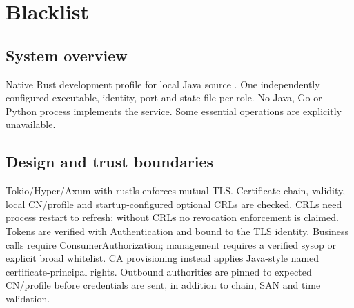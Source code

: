 \documentclass[a4paper]{arrowhead}
\begin{document}
\ArrowheadSetup
{}
\begin{center}\vspace*{6mm}{\LARGE Arrowhead support systems in Rust}\par\vspace{4mm}{\large Development implementation and interface catalogue}\end{center}
\begin{abstract}Fifteen active support-system profiles from the local modified Java tree have native Rust executables. This catalogue distinguishes implemented behavior, explicit unsupported interfaces and unqualified integrations. It is NOT a claim of complete v5.2.2 Java interchangeability.\end{abstract}
\clearpage\tableofcontents\clearpage
\section{Blacklist}
\subsection{System overview}
Native Rust development profile for local Java source . One independently configured executable, identity, port and state file per role. No Java, Go or Python process implements the service. Some essential operations are explicitly unavailable.
\subsection{Design and trust boundaries}
Tokio/Hyper/Axum with rustls enforces mutual TLS. Certificate chain, validity, local CN/profile and startup-configured optional CRLs are checked. CRLs need process restart to refresh; without CRLs no revocation enforcement is claimed. Tokens are verified with Authentication and bound to the TLS identity. Business calls require ConsumerAuthorization; management requires a verified sysop or explicit broad whitelist. CA provisioning instead applies Java-style named certificate-principal rights. Outbound authorities are pinned to expected CN/profile before credentials are sent, in addition to chain, SAN and time validation.
\end{document}
